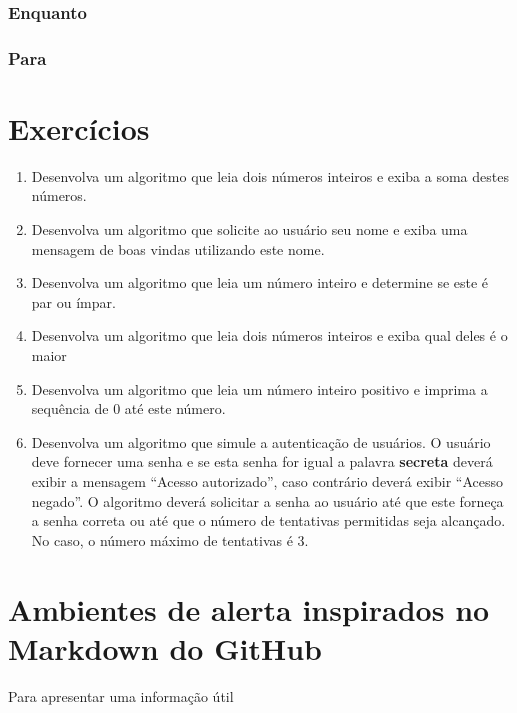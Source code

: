 \documentclass[11pt]{../classes/ifscarticle}
\begin{document}
\subsubsection{Enquanto}



\subsubsection{Para}



\section{Exercícios}

\begin{enumerate}
	\item Desenvolva um algoritmo	que leia dois números inteiros e exiba a soma destes números.
	\item Desenvolva um algoritmo que solicite ao usuário seu nome e exiba uma mensagem de boas vindas utilizando este nome.
	\item Desenvolva um algoritmo que leia um número inteiro e determine se este é par ou ímpar.
	\item Desenvolva um algoritmo que leia dois números inteiros e exiba qual deles é o maior 
	\item Desenvolva um algoritmo que leia um número inteiro positivo e imprima a sequência de 0 até este número. 		\item Desenvolva um algoritmo que simule a autenticação de usuários. O usuário deve fornecer uma senha e se esta senha for igual a palavra \textbf{secreta} deverá exibir a mensagem ``Acesso autorizado'', caso contrário deverá exibir ``Acesso negado''. O algoritmo deverá solicitar a senha ao usuário até que este forneça a senha correta ou até que o número de tentativas permitidas seja alcançado. No caso, o número máximo de tentativas é $3$.
\end{enumerate}

\section{Ambientes de alerta inspirados no Markdown do GitHub}

\begin{note}
	Para apresentar uma informação útil 
\end{note}
\end{document}
